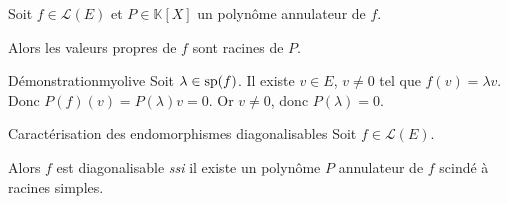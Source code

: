     \begin{prop}{}{}
        Soit $f \in \mathcal{L}(E)$ et $P \in \mathbb{K}[X]$ un polynôme annulateur de $f$.

        Alors les valeurs propres de $f$ sont racines de $P$.
    \end{prop}

    \begin{demo}{Démonstration}{myolive}
        Soit $\lambda \in \sp(f)$. Il existe $v \in E$, $v \neq 0$ tel que $f(v) = \lambda v$. Donc $P(f)(v) = P(\lambda)v = 0$. Or $v \neq 0$, donc $P(\lambda) = 0$.
    \end{demo}

    \begin{theo}{Caractérisation des endomorphismes diagonalisables}{}
        Soit $f \in \mathcal{L}(E)$.

        Alors $f$ est diagonalisable \textit{ssi} il existe un polynôme $P$ annulateur de $f$ scindé à racines simples.
    \end{theo}

